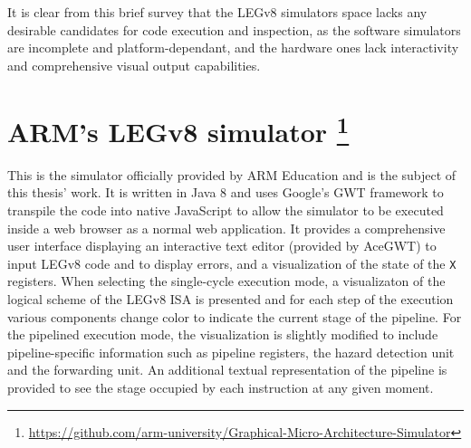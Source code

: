 It is clear from this brief survey that the LEGv8 simulators space lacks any desirable candidates for code execution and inspection, as the software simulators are incomplete and platform-dependant, and the hardware ones lack interactivity and comprehensive visual output capabilities.

\section*{ARM's LEGv8 simulator \footnote{\url{https://github.com/arm-university/Graphical-Micro-Architecture-Simulator}}}

This is the simulator officially provided by ARM Education and is the subject of this thesis' work. It is written in Java 8 and uses Google's GWT framework to transpile the code into native JavaScript to allow the simulator to be executed inside a web browser as a normal web application. It provides a comprehensive user interface displaying an interactive text editor (provided by AceGWT) to input LEGv8 code and to display errors, and a visualization of the state of the \verb|X| registers.
When selecting the single-cycle execution mode, a visualizaton of the logical scheme of the LEGv8 ISA is presented and for each step of the execution various components change color to indicate the current stage of the pipeline. For the pipelined execution mode, the visualization is slightly modified to include pipeline-specific information such as pipeline registers, the hazard detection unit and the forwarding unit. An additional textual representation of the pipeline is provided to see the stage occupied by each instruction at any given moment.

